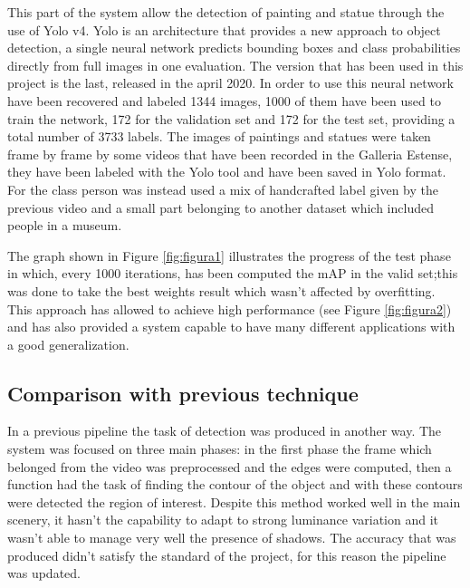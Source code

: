 This part of the system allow the detection of painting and statue through the use of Yolo v4.
Yolo is an architecture that provides a new approach to object detection, a single neural network predicts bounding boxes and class probabilities directly from full images in one evaluation. The version that has been used in this project is the last, released in the april 2020.
In order to use this neural network have been recovered and labeled 1344 images, 1000 of them have been used to train the network, 172 for the validation set and 172 for the test set, providing a total number of 3733 labels. The images of paintings and statues were taken frame by frame by some videos that have been recorded in the Galleria Estense, they have been labeled with the Yolo tool and have been saved in Yolo format. For the class person was instead used a mix of handcrafted label given by the previous video and a small part belonging to another dataset which included people in a museum.

The graph shown in Figure \ref{fig:figura1} illustrates the progress of the test phase in which, every 1000 iterations, has been computed the mAP in the valid set;this was done to take the best weights result which wasn't affected by overfitting.
This approach has allowed to achieve high performance (see Figure \ref{fig:figura2}) %
and has also provided a system capable to have many different applications with a good generalization.


\subsection{Comparison with previous technique} 
In a previous pipeline the task of detection was produced in another way.
The system was focused on three main phases: in the first phase the frame which belonged from the video was preprocessed and the edges were computed, then a function had the task of finding the contour of the object and with these contours were detected the region of interest. Despite this method worked well in the main scenery, it hasn't the capability to adapt to strong luminance variation and it wasn't able to manage very well the presence of shadows.
The accuracy that was produced didn't satisfy the standard of the project, for this reason the pipeline was updated.

